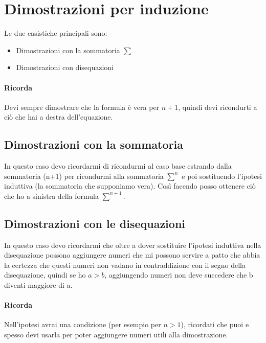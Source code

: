 \documentclass[12pt, a4paper, openany]{book}
\begin{document}
\section*{Dimostrazioni per induzione}
Le due casistiche principali sono:
\begin{itemize}
	\item Dimostrazioni con la sommatoria $\sum$
	\item Dimostrazioni con disequazioni
\end{itemize}
\paragraph*{Ricorda} Devi sempre dimostrare che la formula è vera per $n+1$, quindi devi ricondurti a
ciò che hai a destra dell'equazione.

\subsection*{Dimostrazioni con la sommatoria}
In questo caso devo ricordarmi di ricondurmi al caso base estrando dalla sommatoria (n+1)
per ricondurmi alla sommatoria $\sum^n$ e poi sostituendo l'ipotesi induttiva
(la sommatoria che supponiamo vera). Così facendo posso ottenere ciò che ho a sinistra della
formula $\sum^{n+1}$.
\subsection*{Dimostrazioni con le disequazioni}
In questo caso devo ricordarmi che oltre a dover sostituire l'ipotesi induttiva nella disequazione
possono aggiungere numeri che mi possono servire a patto che abbia la certezza che questi numeri non
vadano in contraddizione con il segno della disequazione, quindi se ho $a>b$, aggiungendo numeri non deve succedere
che b diventi maggiore di a.
\paragraph*{Ricorda} Nell'ipotesi avrai una condizione (per esempio per $n>1$), ricordati che puoi e spesso
devi usarla per poter aggiungere numeri utili alla dimostrazione.
\end{document}
